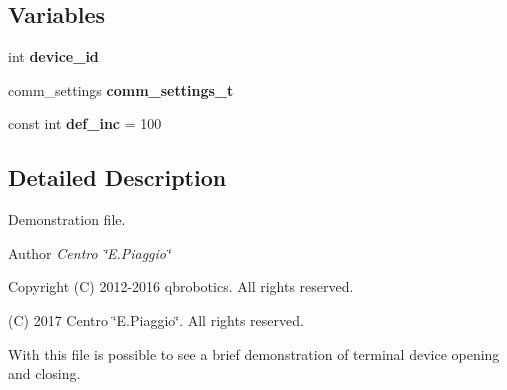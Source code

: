 \subsection*{Variables}
\begin{DoxyCompactItemize}
\item 
\mbox{\label{hand__demo_8c_accfd0301c469314772cc651ec198d492}} 
int {\bfseries device\+\_\+id}
\item 
\mbox{\label{hand__demo_8c_a92153f4b70cd8ba4e9b502ccff8d28bf}} 
comm\+\_\+settings {\bfseries comm\+\_\+settings\+\_\+t}
\item 
\mbox{\label{hand__demo_8c_a08c3ee234f2235f48480efc1225c50b3}} 
const int {\bfseries def\+\_\+inc} = 100
\end{DoxyCompactItemize}


\subsection{Detailed Description}
Demonstration file. 

\begin{DoxyAuthor}{Author}
{\itshape Centro \char`\"{}\+E.\+Piaggio\char`\"{}} 
\end{DoxyAuthor}
\begin{DoxyCopyright}{Copyright}
(C) 2012-\/2016 qbrobotics. All rights reserved. 

(C) 2017 Centro \char`\"{}\+E.\+Piaggio\char`\"{}. All rights reserved.
\end{DoxyCopyright}
With this file is possible to see a brief demonstration of terminal device opening and closing. 